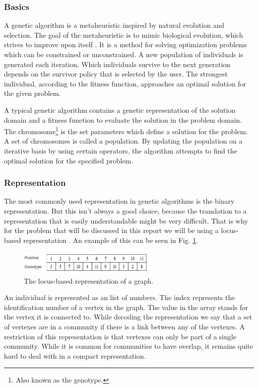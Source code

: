 \subsubsection{Basics}
A genetic algorithm is a metaheuristic inspired by natural evolution and selection.
The goal of the metaheuristic is to mimic biological evolution, which strives to improve upon itself \cite{genetics}.
It is a method for solving optimization problems which can be constrained or unconstrained.
A new population of individuals is generated each iteration.
Which individuals survive to the next generation depends on the survivor policy that is selected by the user.
The strongest individual, according to the fitness function, approaches an optimal solution for the given problem.

A typical genetic algorithm contains a genetic representation of the solution domain and a fitness function to evaluate the solution in the problem domain.
The chromosome\footnote{Also known as the genotype.} is the set parameters which define a solution for the problem.
A set of chromosomes is called a population.
By updating the population on a iterative basis by using certain operators, the algorithm attempts to find the optimal solution for the specified problem.

\subsubsection{Representation}
The most commonly used representation in genetic algorithms is the binary representation.
But this isn't always a good choice, because the translation to a representation that is easily understandable might be very difficult.
That is why for the problem that will be discussed in this report we will be using a locus-based representation \cite{Li2016}.
An example of this can be seen in Fig. \ref{figure:locus}.

\begin{figure}
\begin{center}
\includegraphics[width=0.6\textwidth]{images/locus.png}
\caption{The locus-based representation of a graph.}\label{figure:locus}
\end{center}
\end{figure}

An individual is represented as an list of numbers. 
The index represents the identification number of a vertex in the graph.
The value in the array stands for the vertex it is connected to.
While decoding the representation we say that a set of vertexes are in a community if there is a link between any of the vertexes.
A restriction of this representation is that vertexes can only be part of a single community.
While it is common for communities to have overlap, it remains quite hard to deal with in a compact representation.

